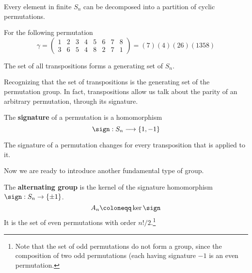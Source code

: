   \begin{lemma}
    Every element in finite $S_{n}$ can be decomposed into a partition of cyclic permutations.
  \end{lemma}

  \begin{example}
    For the following permutation
    \begin{equation}
      \gamma = \begin{pmatrix} 
        1 & 2 & 3 & 4 & 5 & 6 & 7 & 8 \\ 
        3 & 6 & 5 & 4 & 8 & 2 & 7 & 1 
      \end{pmatrix} = (7)(4)(26)(1358)
    \end{equation} 
  \end{example}

  \begin{theorem}[Transpositions]
    The set of all transpositions forms a generating set of $S_{n}$. 
  \end{theorem}

  Recognizing that the set of transpositions is the generating set of the permutation group. In fact, transpositions allow us talk about the parity of an arbitrary permutation, through its signature. 

  \begin{definition}[Signature]
    The \textbf{signature} of a permutation is a homomorphism
    \begin{equation}
      \sign : S_{n} \longrightarrow \{1, -1\}
    \end{equation}
  \end{definition}

  \begin{lemma}
    The signature of a permutation changes for every transposition that is applied to it. 
  \end{lemma} 

  Now we are ready to introduce another fundamental type of group. 

  \begin{definition}
    The \textbf{alternating group} is the kernel of the signature homomorphism $\sign: S_n \to \{\pm 1\}$. 
    \begin{equation}
      A_n \coloneqq \ker{\sign}
    \end{equation}
    It is the set of even permutations with order $n!/2$.\footnote{Note that the set of odd permutations do not form a group, since the composition of two odd permutations (each having signature $-1$ is an even permutation. }
  \end{definition}

